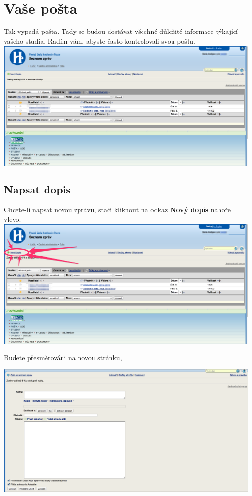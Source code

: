 \documentclass[a4paper,12pt]{article}
\begin{document}
\newpage

\section{Vaše pošta}
Tak vypadá pošta. Tady se budou dostávat všechné důležité
informace týkající vašeho studia. 
Radím vám, abyste často kontrolovali svou poštu. \\

\includegraphics[width=\textwidth]{s08}

\subsection{Napsat dopis}

Chcete-li napsat novou zprávu, stačí kliknout na odkaz \textbf{Nový dopis} nahoře vlevo. \\

\includegraphics[width=\textwidth]{s09}

\newpage
Budete přesměrováni na novou stránku, 

\includegraphics[width=\textwidth]{s10-2} \\
\end{document}

